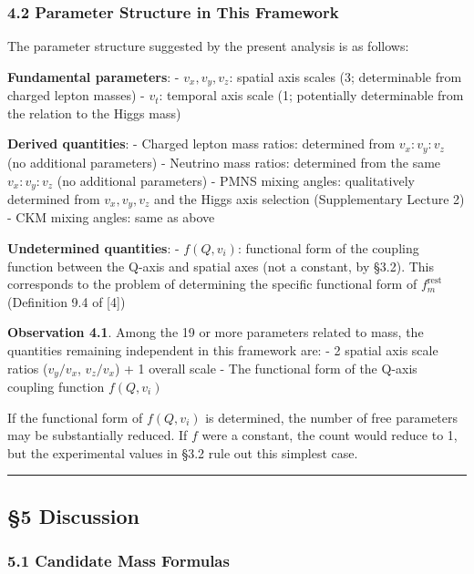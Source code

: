 \documentclass[
  a4paper,11pt]{article}
\theoremstyle{definition}
\theoremstyle{remark}
\begin{document}
\subsubsection{4.2 Parameter Structure in This
Framework}\label{parameter-structure-in-this-framework}

The parameter structure suggested by the present analysis is as follows:

\textbf{Fundamental parameters}: - \(v_x, v_y, v_z\): spatial axis
scales (3; determinable from charged lepton masses) - \(v_t\): temporal
axis scale (1; potentially determinable from the relation to the Higgs
mass)

\textbf{Derived quantities}: - Charged lepton mass ratios: determined
from \(v_x : v_y : v_z\) (no additional parameters) - Neutrino mass
ratios: determined from the same \(v_x : v_y : v_z\) (no additional
parameters) - PMNS mixing angles: qualitatively determined from
\(v_x, v_y, v_z\) and the Higgs axis selection (Supplementary Lecture 2)
- CKM mixing angles: same as above

\textbf{Undetermined quantities}: - \(f(Q, v_i)\): functional form of
the coupling function between the Q-axis and spatial axes (not a
constant, by §3.2). This corresponds to the problem of determining the
specific functional form of \(f_m^{\text{rest}}\) (Definition 9.4 of
{[}4{]})

\textbf{Observation 4.1}. Among the 19 or more parameters related to
mass, the quantities remaining independent in this framework are: - 2
spatial axis scale ratios (\(v_y/v_x\), \(v_z/v_x\)) + 1 overall scale -
The functional form of the Q-axis coupling function \(f(Q, v_i)\)

If the functional form of \(f(Q, v_i)\) is determined, the number of
free parameters may be substantially reduced. If \(f\) were a constant,
the count would reduce to 1, but the experimental values in §3.2 rule
out this simplest case.

\begin{center}\rule{0.5\linewidth}{0.5pt}\end{center}

\subsection{§5 Discussion}\label{discussion}

\subsubsection{5.1 Candidate Mass
Formulas}\label{candidate-mass-formulas}
\end{document}
